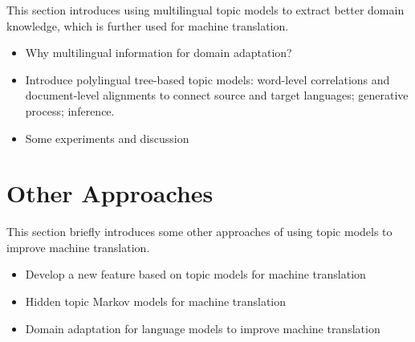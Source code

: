 This section introduces using multilingual topic models to extract better domain knowledge, which is further used for machine translation.
\begin{itemize}
\item Why multilingual information for domain adaptation?
\item Introduce polylingual tree-based topic models: word-level correlations and document-level alignments to connect source and target languages; generative process; inference.
\item Some experiments and discussion
\end{itemize}

\section{Other Approaches}

This section briefly introduces some other approaches of using topic models to improve machine translation.
\begin{itemize}
\item Develop a new feature based on topic models for machine translation
\item Hidden topic Markov models for machine translation
\item Domain adaptation for language models to improve machine translation
\end{itemize}
